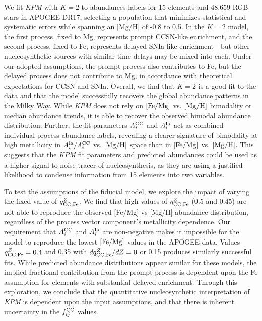 \documentclass[modern, linenumbers]{aastex631}
\newcommand{\femg}{[{\rm Fe}/{\rm Mg}]}
\newcommand{\mgh}{[{\rm Mg}/{\rm H}]}
\newcommand{\qccFe}{q_{{\rm CC, Fe}}^{Z}}
\newcommand{\dqccFe}{dq_{{\rm CC, Fe}}^{Z}/dZ}
\newcommand{\Acc}{A^{\rm CC}_{i}}
\newcommand{\AIa}{A^{\rm Ia}_{i}}
\newcommand{\fcc}{f_{ij}^{\rm CC}}
\newcommand{\name}{\textsl{KPM}}
\begin{document}
We fit \name{} with $K=2$ to abundances labels for 15 elements and 48,659 RGB stars in APOGEE DR17, selecting a population that minimizes statistical and systematic errors while spanning an [Mg/H] of -0.8 to 0.5.
In the $K=2$ model, the first process, fixed to Mg, represents prompt CCSN-like enrichment, and the second process, fixed to Fe, represents delayed SNIa-like enrichment---but other nucleosynthetic sources with similar time delays may be mixed into each. Under our adopted assumptions, the prompt process also contributes to Fe, but the delayed process does not contribute to Mg, in accordance with theoretical expectations for CCSN and SNIa. Overall, we find that $K=2$ is a good fit to the data and that the model successfully recovers the global abundance patterns in the Milky Way. While \name{} does not rely on $\femg$ vs. $\mgh$ bimodality or median abundance trends, it is able to recover the observed bimodal abundance distribution. Further, the fit parameters $\Acc$ and $\AIa$ act as combined individual-process abundance labels, revealing a clearer signature of bimodality at high metallicity in $\AIa/\Acc$ vs. $\mgh$ space than in $\femg$ vs. $\mgh$. This suggests that the \name{} fit parameters and predicted abundances could be used as a higher signal-to-noise tracer of nucleosynthesis, as they are using a justified likelihood to condense information from 15 elements into two variables.

To test the assumptions of the fiducial model, we explore the impact of varying the fixed value of $\qccFe$.
We find that high values of $\qccFe$ (0.5 and 0.45) are not able to reproduce the observed [Fe/Mg] vs [Mg/H] abundance distribution, regardless of the process vector component's metallicity dependence.
Our requirement that $\Acc$ and $\AIa$ are non-negative makes it impossible for the model to reproduce the lowest $\femg$ values in the APOGEE data. Values $\qccFe = 0.4$ and 0.35 with $\dqccFe = 0$ or 0.15 produces similarly successful fits. While predicted abundance distributions appear similar for these models, the implied fractional contribution from the prompt process is dependent upon the Fe assumption for elements with substantial delayed enrichment. Through this exploration, we conclude that the quantitative nucleosynthetic interpretation of \name{} is dependent upon the input assumptions, and that there is inherent uncertainty in the $\fcc$ values. 
\end{document}

